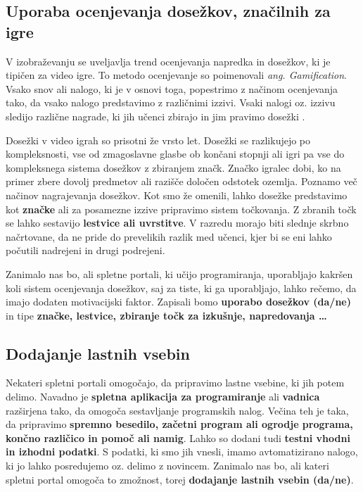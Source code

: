 \subsection{Uporaba ocenjevanja dosežkov, značilnih za igre}
\label{sec:uporaba_dosežkov}

V izobraževanju se uveljavlja trend ocenjevanja napredka in dosežkov,
ki je tipičen za video igre. To metodo ocenjevanje so poimenovali
\emph{ang. Gamification}. Vsako snov ali nalogo, ki je v osnovi toga,
popestrimo z načinom ocenjevanja tako, da vsako nalogo predstavimo z
različnimi izzivi. Vsaki nalogi oz. izzivu sledijo različne nagrade,
ki jih učenci zbirajo in jim pravimo dosežki \cite{web:edublogger}.

Dosežki v video igrah so prisotni že vrsto let. Dosežki se razlikujejo
po kompleksnosti, vse od zmagoslavne glasbe ob končani stopnji ali
igri pa vse do kompleksnega sistema dosežkov z zbiranjem
značk. Značko igralec dobi, ko na primer zbere dovolj predmetov ali
razišče določen odstotek ozemlja. Poznamo več načinov nagrajevanja
dosežkov. Kot smo že omenili, lahko dosežke predstavimo kot
\textbf{značke} ali za posamezne izzive pripravimo sistem točkovanja. Z zbranih točk se lahko sestavijo \textbf{lestvice
  ali uvrstitve}. V razredu  morajo biti slednje skrbno načrtovane, da
ne pride do prevelikih razlik med učenci, kjer bi se eni lahko
počutili nadrejeni in drugi podrejeni.

Zanimalo nas bo, ali spletne portali, ki učijo programiranja,
uporabljajo kakršen koli sistem ocenjevanja dosežkov, saj za tiste, ki
ga uporabljajo, lahko rečemo, da imajo dodaten motivacijski
faktor. Zapisali bomo \textbf{uporabo dosežkov (da/ne)} in tipe
\textbf{značke, lestvice, zbiranje točk za izkušnje, napredovanja  \dots}

\subsection{Dodajanje lastnih vsebin}
\label{sec:dodajanje_vsebin}

Nekateri spletni portali omogočajo, da pripravimo lastne vsebine, ki
jih potem delimo. Navadno je \textbf{spletna aplikacija za
  programiranje} ali \textbf{vadnica} razširjena tako, da omogoča
sestavljanje programskih nalog. Večina teh je taka, da pripravimo
\textbf{spremno besedilo, začetni program ali ogrodje programa, končno
  različico in pomoč ali namig}. Lahko so dodani tudi \textbf{testni
  vhodni in izhodni podatki}. S podatki, ki smo jih vnesli, imamo
avtomatizirano nalogo, ki jo lahko posredujemo oz. delimo z
novincem. Zanimalo nas bo, ali kateri spletni portal omogoča to
zmožnost, torej \textbf{dodajanje lastnih vsebin (da/ne)}.

